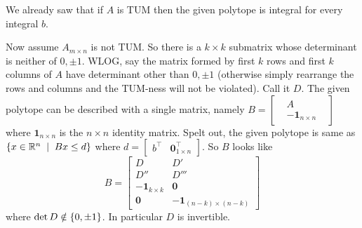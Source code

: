 We already saw that if $A$ is TUM then the given polytope is integral for every integral $b$.

Now assume $A_{m\times n}$ is not TUM. So there is a $k\times k$ submatrix whose determinant is neither of $0,\pm 1$. WLOG, say the matrix formed by first $k$ rows and first $k$ columns of $A$ have determinant other than $0,\pm 1$ (otherwise simply rearrange the rows and columns and the TUM-ness will not be violated). Call it $D$. The given polytope can be described with a single matrix, namely $B = \begin{bmatrix}&A&\\ &-\pmb 1_{n\times n}&\end{bmatrix}$ where $\pmb 1_{n\times n}$ is the $n\times n$ identity matrix. Spelt out, the given polytope is same as $\set{x\in\R^{n}\st Bx \le d}$ where $d = \begin{bmatrix}b^{\top}&\pmb 0_{1\times n}^{\top}\end{bmatrix}$. So $B$ looks like $$B = \begin{bmatrix}D & D'\\D''&D'''\\ -\pmb 1_{k\times k} & \pmb0\\\pmb0&-\pmb 1_{(n-k)\times (n-k)}\end{bmatrix}$$ where $\det D\notin\left\{0,\pm 1\right\}$. In particular $D$ is invertible.

